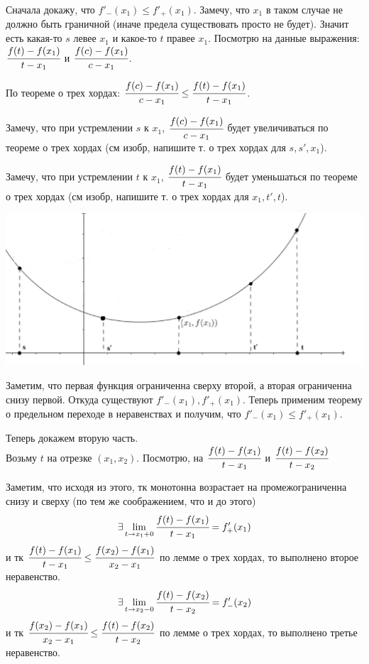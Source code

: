 Сначала докажу, что $f'_-(x_1)\leq f'_+(x_1)$. Замечу, что $x_1$ в таком случае не должно быть граничной (иначе предела существовать просто не будет). Значит есть какая-то $s$ левее $x_1$ и какое-то $t$ правее $x_1$. Посмотрю на данные выражения:
$\cfrac{f(t)-f(x_1)}{t-x_1}$ и $\cfrac{f(c)-f(x_1)}{c-x_1}$. 

По теореме о трех хордах: $\cfrac{f(c)-f(x_1)}{c-x_1} \leq \cfrac{f(t)-f(x_1)}{t-x_1}$.

Замечу, что при устремлении $s$ к $x_1$,  $\cfrac{f(c)-f(x_1)}{c-x_1}$ будет увеличиваться по теореме о трех хордах (см изобр, напишите т. о трех хордах для $s,s',x_1$).

Замечу, что при устремлении $t$ к $x_1$,  $\cfrac{f(t)-f(x_1)}{t-x_1}$ будет  уменьшаться по теореме о трех хордах (см изобр, напишите т. о трех хордах для $x_1,t',t$).


\begin{center}
 \includegraphics[width = 15cm]{assets/integral_1.png}
\end{center}

Заметим, что первая функция ограниченна сверху второй, а вторая ограниченна снизу первой. Откуда существуют  $f'_-(x_1), f'_+(x_1)$. Теперь применим теорему о предельном переходе в неравенствах и получим, что $f'_-(x_1)\leq f'_+(x_1)$.

Теперь докажем вторую часть.\\
Возьму $t$ на отрезке $(x_1,x_2)$. Посмотрю, на  $\cfrac{f(t)-f(x_1)}{t-x_1}$ и $\cfrac{f(t)-f(x_2)}{t-x_2}$

Заметим, что исходя из этого, тк монотонна возрастает на промежограниченна снизу и сверху (по тем же соображением, что и до этого)
$$\exists  \lim\limits_{t \rightarrow x_1 + 0}\cfrac{f(t)-f(x_1)}{t-x_1} = f'_+(x_1)$$ и тк $\cfrac{f(t)-f(x_1)}{t-x_1}\leq\cfrac{f(x_2)-f(x_1)}{x_2-x_1}$ по лемме о трех хордах, то выполнено второе неравенство.
$$\exists  \lim\limits_{t \rightarrow x_2 - 0}\cfrac{f(t)-f(x_2)}{t-x_2} = f'_-(x_2)$$ и тк $ \cfrac{f(x_2)-f(x_1)}{x_2-x_1}\leq \cfrac{f(t)-f(x_2)}{t-x_2}$ по лемме о трех хордах, то выполнено третье неравенство.

